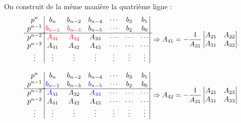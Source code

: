 On construit de la même manière la quatrième ligne :
\[
\begin{matrix}
    p^n    \\
    p^{n-1}\\
    \hline
    p^{n-2}\\
    p^{n-3}\\
    \vdots \\
\end{matrix}
\begin{vmatrix}
    b_n       & b_{n-2}    & b_{n-4}    & \cdots & b_3            & b_1 \\
     \textcolor{red}{b_{n-1}}   & \textcolor{red}{b_{n-3}}    & b_{n-5}    
                                & \cdots & b_2            & b_0         \\
    \hline
     \textcolor{red}{A_{31}}    &  \textcolor{red}{A_{32}}    & A_{33}    
                                & \cdots & \cdots         & \cdots      \\
    A_{41}   & A_{42}     & A_{43}    & \cdots & \cdots   & \cdots      \\
    \vdots   & \vdots     & \vdots    & \vdots & \vdots   & \vdots      \\
    \end{vmatrix}
\Rightarrow
A_{41}=-\dfrac{1}{A_{31}}
\begin{vmatrix} 
A_{21} & A_{22} \\ A_{31} & A_{22}
\end{vmatrix}
\]

\[
\begin{matrix}
    p^n    \\
    p^{n-1}\\
    \hline
    p^{n-2}\\
    p^{n-3}\\
    \vdots \\
\end{matrix}
\begin{vmatrix}
    b_n       & b_{n-2}    & b_{n-4}    & \cdots & b_3            & b_1  \\
    \textcolor{blue}{b_{n-1}}   &  b_{n-3}    & \textcolor{blue}{b_{n-5}}    
    & \cdots & b_2            & b_0         \\
    \hline
    \textcolor{blue}{A_{31}}     &  A_{32}    & \textcolor{blue}{A_{33}}    
    & \cdots & \cdots         & \cdots      \\
    A_{41}      & A_{42}     & A_{43}    & \cdots & \cdots    & \cdots   \\
    \vdots    & \vdots     & \vdots     & \vdots & \vdots     & \vdots   \\
    \end{vmatrix}
\Rightarrow
A_{42}=-\dfrac{1}{A_{31}}
\begin{vmatrix} 
A_{21} & A_{23} \\ A_{31} & A_{33} 
\end{vmatrix}
\]

